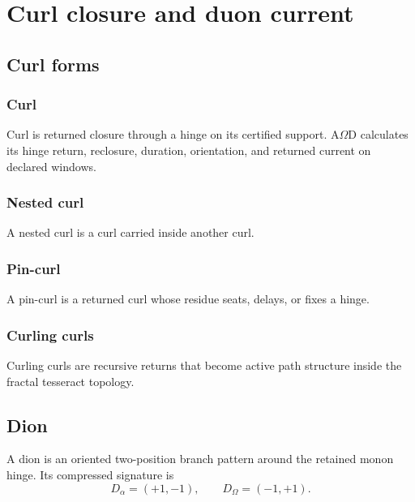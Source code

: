 \section{Curl closure and duon current}
\label{sec:motif-field-folding}
\label{sec:curl-closure-duon-current}
\subsection{Curl forms}\label{subsec:curl-closure}
\subsubsection{Curl}\label{subsec:curl}
\begin{definition}
Curl is returned closure through a hinge on its certified support. A\(\Omega\)D calculates its hinge return, reclosure, duration, orientation, and returned current on declared windows.
\end{definition}

\subsubsection{Nested curl}\label{subsec:nested-curl}
\begin{definition}
A nested curl is a curl carried inside another curl.
\end{definition}

\subsubsection{Pin-curl}\label{subsec:pin-curl}
\begin{definition}
A pin-curl is a returned curl whose residue seats, delays, or fixes a hinge.
\end{definition}

\subsubsection{Curling curls}\label{subsec:curling-curls}
\begin{definition}
Curling curls are recursive returns that become active path structure inside the fractal tesseract topology.
\end{definition}

\subsection{Dion}\label{subsec:dion}
\begin{definition}
A dion is an oriented two-position branch pattern around the retained monon hinge. Its compressed signature is
\[
D_\alpha=(+1,-1),\qquad D_\Omega=(-1,+1).
\]
\end{definition}

